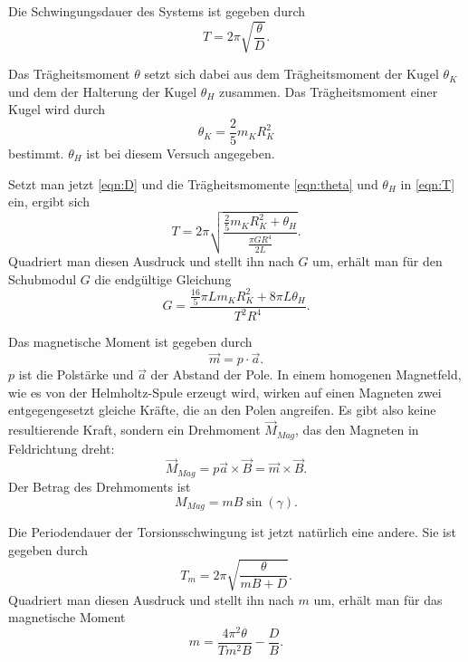\noindent Die Schwingungsdauer des Systems ist gegeben durch 
\begin{equation}
    T = 2 \pi \sqrt{\frac{\theta}{D}}.
    \label{eqn:T}
\end{equation}

\noindent Das Trägheitsmoment $\theta$ setzt sich dabei aus dem Trägheitsmoment der Kugel
$\theta_K$ und dem der Halterung der Kugel $\theta_H$ zusammen.
Das Trägheitsmoment einer Kugel wird durch
\begin{equation}
    \theta_{K} = \frac{2}{5} m_{K} R_{K}^2
    \label{eqn:theta}
\end{equation}
bestimmt.
$\theta_{H}$ ist bei diesem Versuch angegeben.

\noindent Setzt man jetzt \eqref{eqn:D} und die Trägheitsmomente \eqref{eqn:theta} und $\theta_{H}$ in \eqref{eqn:T} ein, ergibt sich
\begin{equation*}
    T = 2 \pi \sqrt{\frac{\frac{2}{5} m_{K} R_{K}^2 + \theta_{H}}{\frac{\pi G R^4}{2 L}}}.
\end{equation*}
Quadriert man diesen Ausdruck und stellt ihn nach $G$ um, erhält man für
den Schubmodul $G$ die endgültige Gleichung
\begin{equation}
    G = \frac{\frac{16}{5} \pi L m_{K} R_{K}^{2} + 8 \pi L \theta_{H}}{T^2 R^4}.
    \label{eqn:G}
\end{equation}

\noindent Das magnetische Moment ist gegeben durch
\begin{equation*}
    \vec{m} = p \cdot \vec{a}.
\end{equation*}
$p$ ist die Polstärke und $\vec{a}$ der Abstand der Pole.
In einem homogenen Magnetfeld, wie es von der Helmholtz-Spule erzeugt wird,
wirken auf einen Magneten zwei entgegengesetzt gleiche Kräfte, die an den
Polen angreifen. Es gibt also keine resultierende Kraft, sondern ein
Drehmoment $\vec{M}_{Mag}$, das den Magneten in Feldrichtung dreht:
\begin{equation*}
    \vec{M}_{Mag} = p \vec{a} \times \vec{B} = \vec{m} \times \vec{B}.
\end{equation*}
Der Betrag des Drehmoments ist 
\begin{equation*}
    M_{Mag} = mB \sin(\gamma).
\end{equation*}

\noindent Die Periodendauer der Torsionsschwingung ist jetzt natürlich eine andere.
Sie ist gegeben durch
\begin{equation*}
    T_{m} = 2 \pi \sqrt{\frac{\theta}{mB+D}}.
\end{equation*}
Quadriert man diesen Ausdruck und stellt ihn nach $m$ um, erhält man
für das magnetische Moment
\begin{equation}
    m = \frac{4 \pi^2 \theta}{T m^2 B} - \frac{D}{B}.
\end{equation}
